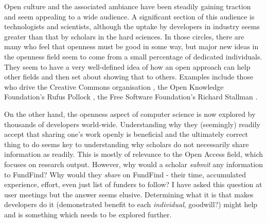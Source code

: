 Open culture and the associated ambiance have been steadily gaining traction and seem appealing to a wide audience. A significant section of this audience is technologists and scientists, although the uptake by developers in industry seems greater than that by scholars in the hard sciences. In those circles, there are many who feel that openness must be good in some way, but major new ideas in the openness field seem to come from a small percentage of dedicated individuals. They seem to have a very well-defined idea of how an open approach can help other fields and then set about showing that to others. Examples include those who drive the Creative Commons organisation \cite{cc-team}, the Open Knowledge Foundation's Rufus Pollock \cite{rufus}, the Free Software Foundation's Richard Stallman \cite{rms}.

On the other hand, the openness aspect of computer science is now explored by thousands of developers world-wide. Understanding why they (seemingly) readily accept that sharing one's work openly is beneficial and the ultimately correct thing to do seems key to understanding why scholars do not necessarily share information as readily. This is mostly of relevance to the Open Access field, which focuses on research output. However, why would a scholar \emph{submit} any information to FundFind? Why would they \emph{share} on FundFind - their time, accumulated experience, effort, even just list of funders to follow? I have asked this question at user meetings but the answer seems elusive. Determining what it is that makes developers do it (demonstrated benefit to each \emph{individual}, goodwill?) might help and is something which needs to be explored further.